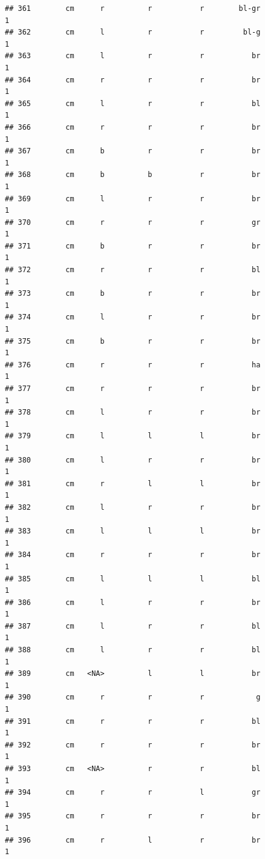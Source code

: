 \documentclass[]{article}
\begin{document}
\begin{verbatim}
## 361        cm      r          r           r        bl-gr             1
## 362        cm      l          r           r         bl-g             1
## 363        cm      l          r           r           br             1
## 364        cm      r          r           r           br             1
## 365        cm      l          r           r           bl             1
## 366        cm      r          r           r           br             1
## 367        cm      b          r           r           br             1
## 368        cm      b          b           r           br             1
## 369        cm      l          r           r           br             1
## 370        cm      r          r           r           gr             1
## 371        cm      b          r           r           br             1
## 372        cm      r          r           r           bl             1
## 373        cm      b          r           r           br             1
## 374        cm      l          r           r           br             1
## 375        cm      b          r           r           br             1
## 376        cm      r          r           r           ha             1
## 377        cm      r          r           r           br             1
## 378        cm      l          r           r           br             1
## 379        cm      l          l           l           br             1
## 380        cm      l          r           r           br             1
## 381        cm      r          l           l           br             1
## 382        cm      l          r           r           br             1
## 383        cm      l          l           l           br             1
## 384        cm      r          r           r           br             1
## 385        cm      l          l           l           bl             1
## 386        cm      l          r           r           br             1
## 387        cm      l          r           r           bl             1
## 388        cm      l          r           r           bl             1
## 389        cm   <NA>          l           l           br             1
## 390        cm      r          r           r            g             1
## 391        cm      r          r           r           bl             1
## 392        cm      r          r           r           br             1
## 393        cm   <NA>          r           r           bl             1
## 394        cm      r          r           l           gr             1
## 395        cm      r          r           r           br             1
## 396        cm      r          l           r           br             1

\end{verbatim}
\end{document}
